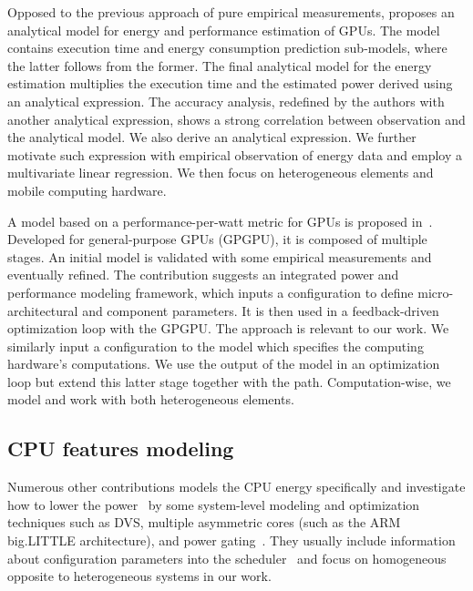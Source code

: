 Opposed to the previous approach of pure empirical measurements, \citep{luo2011performance} proposes an analytical model for energy and performance estimation of GPUs. The model contains execution time and energy consumption prediction sub-models, where the latter follows from the former. The final analytical model for the energy estimation multiplies the execution time and the estimated power derived using an analytical expression. The accuracy analysis, redefined by the authors with another analytical expression, shows a strong correlation between observation and the analytical model. We also derive an analytical expression. We further motivate such expression with empirical observation of energy data and employ a multivariate linear regression. We then focus on heterogeneous elements and mobile computing hardware.

A model based on a performance-per-watt metric for GPUs is proposed in~\citep{leng2013gpuwattch}. Developed for general-purpose GPUs (GPGPU), it is composed of multiple stages. An initial model is validated with some empirical measurements and eventually refined.  The contribution suggests an integrated power and performance modeling framework, which inputs a configuration to define micro-architectural and component parameters. It is then used in a feedback-driven optimization loop with the GPGPU. The approach is relevant to our work. We similarly input a configuration to the model which specifies the computing hardware's computations. We use the output of the model in an optimization loop but extend this latter stage together with the path. Computation-wise, we model and work with both heterogeneous elements.

\subsection{CPU features modeling}
\label{sec:soa-cpu}

Numerous other contributions models the CPU energy specifically and investigate how to lower the power~\citep{hong1999power, luo2001battery, chowdhury2005static} by some system-level modeling and optimization techniques such as DVS, multiple asymmetric cores (such as the ARM big.LITTLE architecture), and power gating~\citep{walker2017accurate}. They usually include information about configuration parameters into the scheduler~\citep{seewald2019coarse} and focus on homogeneous opposite to heterogeneous systems in our work. 

